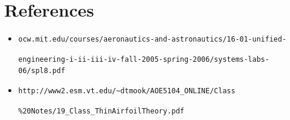 \documentclass{article}
\begin{document}
\section{References}

\begin{itemize}
\item \verb|ocw.mit.edu/courses/aeronautics-and-astronautics/16-01-unified-|

\verb|engineering-i-ii-iii-iv-fall-2005-spring-2006/systems-labs-06/spl8.pdf|





\item \verb|http://www2.esm.vt.edu/~dtmook/AOE5104_ONLINE/Class|

\verb|%20Notes/19_Class_ThinAirfoilTheory.pdf|

\end{itemize}
\end{document}
